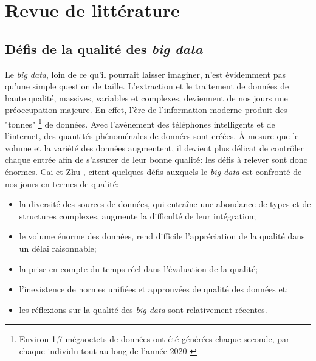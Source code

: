 \section{Revue de litt\'erature }

\subsection{D\'efis de la qualit\'e des \textit{big data}}
Le \textit{big data}, loin de ce qu'il pourrait laisser imaginer, n'est \'evidemment pas qu'une simple question de taille. L'extraction et le traitement de donn\'ees de haute qualit\'e,  massives, variables et complexes, deviennent de nos jours une pr\'eoccupation majeure. En effet, l'ère de l'information moderne produit des "tonnes" \footnote{Environ 1,7 m\'egaoctets de données ont \'et\'e g\'en\'er\'ees chaque seconde, par chaque individu tout au long de l'ann\'ee 2020 \cite{dataGen}} de données. Avec l'avènement des téléphones intelligents et de l'internet, des quantités ph\'enom\'enales de données sont cr\'e\'ees. À mesure que le volume et la variété des données augmentent, il devient plus délicat de contrôler chaque entrée afin de s'assurer de leur bonne qualité: les d\'efis \`a relever sont donc \'enormes. Cai et Zhu \cite{Cai_Zhu_2015}, citent quelques d\'efis auxquels le \textit{big data} est confront\'e de nos jours en termes de qualit\'e: 
\begin{itemize}[parsep=0cm,itemsep=0cm]
\item la diversité des sources de données, qui entraîne une abondance de types et de structures complexes, augmente la difficulté de leur intégration;

\item le volume énorme des données, rend difficile l'appr\'eciation de la qualit\'e dans un d\'elai raisonnable;

\item la prise en compte du temps réel dans l'\'evaluation de la qualit\'e; 

\item l'inexistence de normes unifiées et approuvées de qualité des données et; 

\item les r\'eflexions sur la qualité des \textit{big data} sont relativement r\'ecentes.
\end{itemize}

